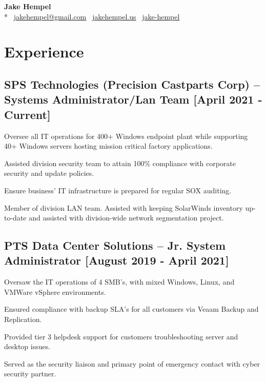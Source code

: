 \documentclass{article}
\begin{document}
\begin{samepage}
\begin{center}
\huge{\textbf{Jake Hempel}} \\*
\large{\faEnvelope \, \href{mailto:jakehempel@gmail.com}{jakehempel@gmail.com}
\faGlobe \, \href{https://jakehempel.us}{jakehempel.us}}
\faLinkedinSquare \, \href{https://www.linkedin.com/in/jake-hempel/}{jake-hempel}
\end{center}

\section{Experience}
\subsection{SPS Technologies (Precision Castparts Corp) -- Systems Administrator/Lan Team [April 2021 - Current]}
\begin{compactitem}
	\item Oversee all IT operations for 400+ Windows endpoint plant while supporting 40+ Windows servers hosting mission critical factory applications.
	\item Assisted division security team to attain 100\% compliance with corporate security and update policies.
	\item Ensure business' IT infrastructure is prepared for regular SOX auditing.
	\item Member of division LAN team. Assisted with keeping SolarWinds inventory up-to-date and assisted with division-wide network segmentation project.
\end{compactitem}
\subsection{PTS Data Center Solutions -- Jr. System Administrator [August 2019 - April 2021]}
\begin{compactitem}
	\item Oversaw the IT operations of 4 SMB's, with mixed Windows, Linux, and VMWare vSphere environments.
	\item Ensured compliance with backup SLA's for all customers via Veaam Backup and Replication.
	\item Provided tier 3 helpdesk support for customers troubleshooting server and desktop issues.
 	\item Served as the security liaison and primary point of emergency contact with cyber security partner.
\end{compactitem}

\end{samepage}
\end{document}
